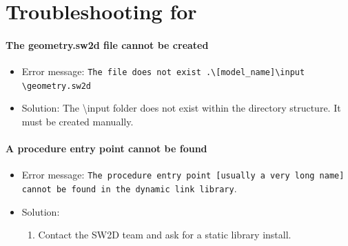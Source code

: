 \section{Troubleshooting for \swConverter}

\paragraph*{The geometry.sw2d file cannot be created} 
\begin{itemize}
	\item Error message: \texttt{The file does not exist .\textbackslash [model\_name]\textbackslash input \textbackslash geometry.sw2d}
	\item Solution: The \textbackslash input folder does not exist within the directory structure. It must be created manually.		
\end{itemize}

\paragraph*{A procedure entry point cannot be found} 
\begin{itemize}
	\item Error message: \texttt{The procedure entry point  [usually a very long name] cannot be found in the dynamic link library}.
	\item Solution: 
	\begin{enumerate}
		\item Contact the SW2D team and ask for a static library install.
	\end{enumerate}
\end{itemize}

